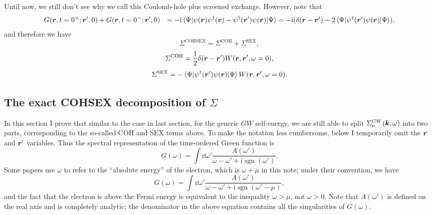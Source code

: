 \documentclass[hyperref, a4paper, 12pt]{report}
\DeclareMathOperator{\sgn}{sgn}
\newcommand*{\ii}{\mathrm{i}}
\def\\{}%
\begin{document}
Until now, we still don't see 
why we call this Coulomb-hole plus screened exchange.
However, note that 
\[
    \begin{aligned}
        &\quad G(\vb*{r}, t = 0^+; \vb*{r}', 0) + 
        G(\vb*{r}, t = 0^-; \vb*{r}', 0) \\
        &= - \ii \expval*{\psi(\vb*{r}) \psi^\dagger(\vb*{r}) - \psi^\dagger(\vb*{r}') \psi(\vb*{r})}{\Psi} \\
        &= - \ii (\delta(\vb*{r} - \vb*{r}') - 
        2 \expval*{\psi^\dagger(\vb*{r}') \psi(\vb*{r})}{\Psi}),
    \end{aligned}
\]
and therefore we have 
\begin{equation}
    \Sigma^{\text{COHSEX}} = \Sigma^{\text{COH}} + \Sigma^{\text{SEX}},
\end{equation}
\begin{equation}
    \Sigma^{\text{COH}} = \frac{1}{2} \delta(\vb*{r} - \vb*{r}') 
    W(\vb*{r}, \vb*{r}', \omega = 0), 
    \label{eq:sigma-coh-general}
\end{equation}
\begin{equation}
    \Sigma^{\text{SEX}} = - \expval*{\psi^\dagger(\vb*{r}') \psi(\vb*{r})}{\Psi}
    W(\vb*{r}, \vb*{r}', \omega = 0).
    \label{eq:sigma-sex-general}
\end{equation}

\subsection{The exact COHSEX decomposition of $\Sigma$}\label{sec:cohsex-exact}

In this section I prove that 
similar to the case in last section, 
for the generic $GW$ self-energy, 
we are still able to split $\Sigma^{GW}_n(\vb*{k}, \omega)$
into two parts, 
corresponding to the so-called COH and SEX terms above. 
To make the notation less cumbersome,
below I temporarily omit the $\vb*{r}$ and $\vb*{r}'$ variables.
Thus the spectral representation of the time-ordered Green function is 
\begin{equation}
    G(\omega) = \int \dd{\omega'} \frac{A(\omega')}{\omega - \omega' + \ii \sgn(\omega')}.
\end{equation}
Some papers use $\omega$ to refer to the ``absolute energy'' of the electron, 
which is $\omega + \mu$ in this note; 
under their convention, we have 
\begin{equation}
    G(\omega) = \int \dd{\omega'} \frac{A(\omega')}{\omega - \omega' + \ii \sgn(\omega' - \mu)},
\end{equation}
and the fact that the electron is above the Fermi energy 
is equivalent to the inequality $\omega > \mu$, 
not $\omega > 0$.
Note that $A(\omega')$ is defined on the real axis 
and is completely analytic;
the denominator in the above equation contains all the singularities of $G(\omega)$.
\end{document}
